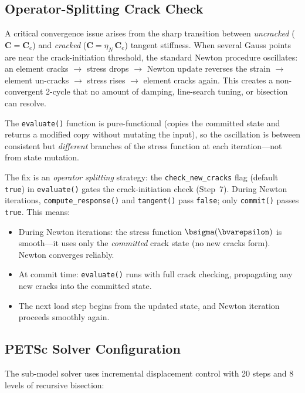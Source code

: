 \subsection{Operator-Splitting Crack Check}
\label{sec:kb3d-operator-splitting}

A critical convergence issue arises from the sharp transition between
\emph{uncracked} ($\mathbf{C} = \mathbf{C}_e$) and \emph{cracked}
($\mathbf{C} = \eta_N\,\mathbf{C}_e$) tangent stiffness.  When several
Gauss points are near the crack-initiation threshold, the standard
Newton procedure oscillates: an element cracks $\to$ stress drops $\to$
Newton update reverses the strain $\to$ element un-cracks $\to$ stress
rises $\to$ element cracks again.  This creates a non-convergent 2-cycle
that no amount of damping, line-search tuning, or bisection can resolve.

The \texttt{evaluate()} function is pure-functional (copies the committed
state and returns a modified copy without mutating the input), so the
oscillation is between consistent but \emph{different} branches of the
stress function at each iteration---not from state mutation.

The fix is an \emph{operator splitting} strategy: the
\texttt{check\_new\_cracks} flag (default \texttt{true}) in
\texttt{evaluate()} gates the crack-initiation check (Step~7).
During Newton iterations, \texttt{compute\_response()} and
\texttt{tangent()} pass \texttt{false}; only \texttt{commit()} passes
\texttt{true}.  This means:

\begin{itemize}
  \item During Newton iterations: the stress function $\bsigma(\bvarepsilon)$
        is smooth---it uses only the \emph{committed} crack state (no new
        cracks form).  Newton converges reliably.
  \item At commit time: \texttt{evaluate()} runs with full crack checking,
        propagating any new cracks into the committed state.
  \item The next load step begins from the updated state, and Newton
        iteration proceeds smoothly again.
\end{itemize}

\subsection{PETSc Solver Configuration}

The sub-model solver uses incremental displacement control with 20 steps
and 8 levels of recursive bisection:

